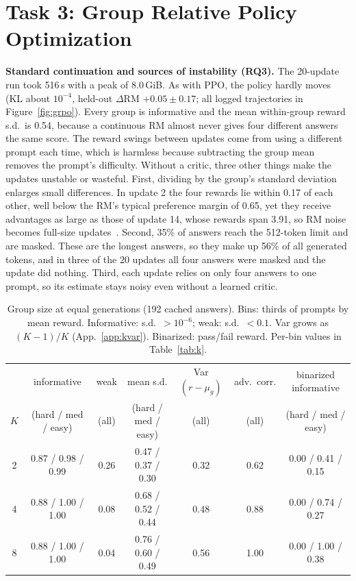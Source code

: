 \documentclass{article}
\begin{document}
\section{Task 3: Group Relative Policy Optimization}
\textbf{Standard continuation and sources of instability (RQ3).} The 20-update run took 516\,s with a peak of 8.0\,GiB. As with PPO, the policy hardly moves (KL about $10^{-4}$, held-out $\Delta$RM $+0.05\pm0.17$; all logged trajectories in Figure~\ref{fig:grpo}). Every group is informative and the mean within-group reward s.d.\ is 0.54, because a continuous RM almost never gives four different answers the same score. The reward swings between updates come from using a different prompt each time, which is harmless because subtracting the group mean removes the prompt's difficulty. Without a critic, three other things make the updates unstable or wasteful. First, dividing by the group's standard deviation enlarges small differences. In update 2 the four rewards lie within 0.17 of each other, well below the RM's typical preference margin of 0.65, yet they receive advantages as large as those of update 14, whose rewards span 3.91, so RM noise becomes full-size updates~\cite{liu2025understanding}. Second, 35\% of answers reach the 512-token limit and are masked. These are the longest answers, so they make up 56\% of all generated tokens, and in three of the 20 updates all four answers were masked and the update did nothing. Third, each update relies on only four answers to one prompt, so its estimate stays noisy even without a learned critic.

\begin{table}[!ht]
\centering\small
\caption{Group size at equal generations (192 cached answers). Bins: thirds of prompts by mean reward. Informative: s.d.\ $>10^{-6}$; weak: s.d.\ $<0.1$. Var grows as $(K{-}1)/K$ (App.~\ref{app:kvar}). Binarized: pass/fail reward. Per-bin values in Table~\ref{tab:k}.}
\label{tab:kmain}
\begin{tabular}{ccccccc}
\toprule
 & informative & weak & mean s.d. & Var$(r-\mu_g)$ & adv.\ corr. & binarized informative \\
$K$ & (hard / med / easy) & (all) & (hard / med / easy) & (all) & (all) & (hard / med / easy) \\
\midrule
2 & 0.87 / 0.98 / 0.99 & 0.26 & 0.47 / 0.37 / 0.30 & 0.32 & 0.62 & 0.00 / 0.41 / 0.15 \\
4 & 0.88 / 1.00 / 1.00 & 0.08 & 0.68 / 0.52 / 0.44 & 0.48 & 0.88 & 0.00 / 0.74 / 0.27 \\
8 & 0.88 / 1.00 / 1.00 & 0.04 & 0.76 / 0.60 / 0.49 & 0.56 & 1.00 & 0.00 / 1.00 / 0.38 \\
\bottomrule
\end{tabular}
\end{table}
\end{document}
